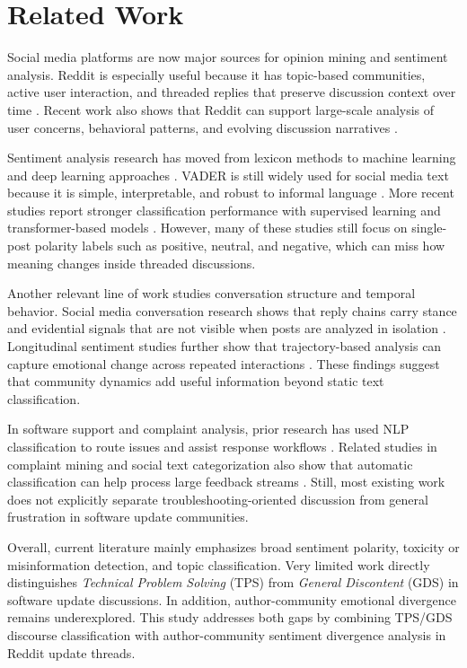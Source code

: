 \documentclass[conference]{IEEEtran}
\begin{document}
\section{Related Work}
\label{related}

Social media platforms are now major sources for opinion mining and sentiment analysis. Reddit is especially useful because it has topic-based communities, active user interaction, and threaded replies that preserve discussion context over time \cite{proferes2021}. Recent work also shows that Reddit can support large-scale analysis of user concerns, behavioral patterns, and evolving discussion narratives \cite{li2023,du2021}.

Sentiment analysis research has moved from lexicon methods to machine learning and deep learning approaches \cite{yue2019}. VADER is still widely used for social media text because it is simple, interpretable, and robust to informal language \cite{hutto2014}. More recent studies report stronger classification performance with supervised learning and transformer-based models \cite{du2021,aydin2025}. However, many of these studies still focus on single-post polarity labels such as positive, neutral, and negative, which can miss how meaning changes inside threaded discussions.

Another relevant line of work studies conversation structure and temporal behavior. Social media conversation research shows that reply chains carry stance and evidential signals that are not visible when posts are analyzed in isolation \cite{zubiaga2015}. Longitudinal sentiment studies further show that trajectory-based analysis can capture emotional change across repeated interactions \cite{liu2024}. These findings suggest that community dynamics add useful information beyond static text classification.

In software support and complaint analysis, prior research has used NLP classification to route issues and assist response workflows \cite{ohata2022}. Related studies in complaint mining and social text categorization also show that automatic classification can help process large feedback streams \cite{omurca2021}. Still, most existing work does not explicitly separate troubleshooting-oriented discussion from general frustration in software update communities.

Overall, current literature mainly emphasizes broad sentiment polarity, toxicity or misinformation detection, and topic classification. Very limited work directly distinguishes \textit{Technical Problem Solving} (TPS) from \textit{General Discontent} (GDS) in software update discussions. In addition, author-community emotional divergence remains underexplored. This study addresses both gaps by combining TPS/GDS discourse classification with author-community sentiment divergence analysis in Reddit update threads.
\end{document}
